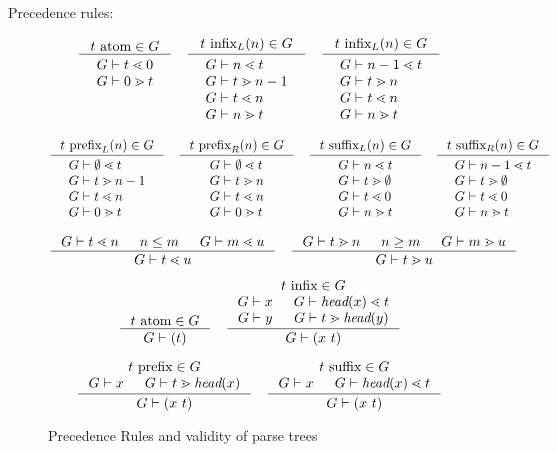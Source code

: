 \documentclass{article}
\begin{document}
Precedence rules:

\begin{figure}

\[
\inference{\hasfix{t}{\atom}{G}}{\twolines{\sld{G}{t}{0}}{\sgd{G}{0}{t}}}
\quad
\inference{\hasfix{t}{\infix{L}{n}}{G}}{\fourlines
  {\sld{G}{n}{t}}
  {\sgd{G}{t}{n-1}}
  {\sld{G}{t}{n}}
  {\sgd{G}{n}{t}}}
\quad
\inference{\hasfix{t}{\infix{L}{n}}{G}}{\fourlines
  {\sld{G}{n-1}{t}}
  {\sgd{G}{t}{n}}
  {\sld{G}{t}{n}}
  {\sgd{G}{n}{t}}}
\]

\[
\inference{\hasfix{t}{\prefix{L}{n}}{G}}{\fourlines
  {\sld{G}{\emptyset}{t}}
  {\sgd{G}{t}{n-1}}
  {\sld{G}{t}{n}}
  {\sgd{G}{0}{t}}}
\quad
\inference{\hasfix{t}{\prefix{R}{n}}{G}}{\fourlines
  {\sld{G}{\emptyset}{t}}
  {\sgd{G}{t}{n}}
  {\sld{G}{t}{n}}
  {\sgd{G}{0}{t}}}
\quad
\inference{\hasfix{t}{\suffix{L}{n}}{G}}{\fourlines
  {\sld{G}{n}{t}}
  {\sgd{G}{t}{\emptyset}}
  {\sld{G}{t}{0}}
  {\sgd{G}{n}{t}}}
\quad
\inference{\hasfix{t}{\suffix{R}{n}}{G}}{\fourlines
  {\sld{G}{n-1}{t}}
  {\sgd{G}{t}{\emptyset}}
  {\sld{G}{t}{0}}
  {\sgd{G}{n}{t}}}
\]

\[
\inference{\sld{G}{t}{n} & n \leq m & \sld{G}{m}{u}}{\sld{G}{t}{u}}
\quad
\inference{\sgd{G}{t}{n} & n \geq m & \sgd{G}{m}{u}}{\sgd{G}{t}{u}}
\]

\[
\inference{\hasfix{t}{\atom}{G}}{\stree{G}{(t)}}
\quad
\inference
  {\hasfix{t}{\infix{}{}}{G} \\ \stree{G}{x} & \sld{G}{\head{x}}{t}
   \\ \stree{G}{y} & \sgd{G}{t}{\head{y}}}
  {\stree{G}{(x\ t)}}
\]

\[
\inference
  {\hasfix{t}{\prefix{}{}}{G} \\ \stree{G}{x} & \sgd{G}{t}{\head{x}}}
  {\stree{G}{(x\ t)}}
\quad
\inference
  {\hasfix{t}{\suffix{}{}}{G} \\ \stree{G}{x} & \sld{G}{\head{x}}{t}}
  {\stree{G}{(x\ t)}}
\]

\caption{Precedence Rules and validity of parse trees}
\end{figure}
\end{document}
